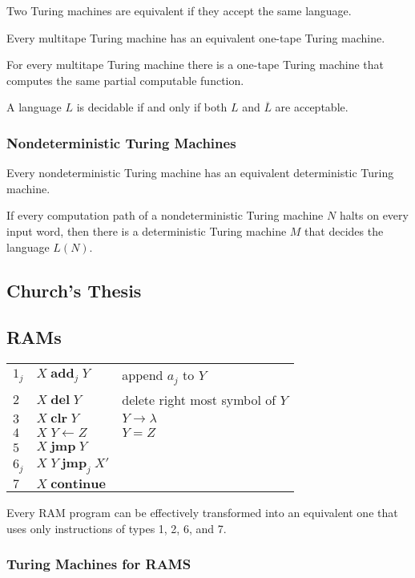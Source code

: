  Two Turing machines are equivalent if they accept the same
language.

 Every multitape Turing machine has an equivalent one-tape
Turing machine.

 For every multitape Turing machine there is a one-tape
Turing machine that computes the same partial computable function.

 A language $L$ is decidable if and only if both $L$ and
$\overline{L}$ are acceptable.

\subsubsection{Nondeterministic Turing Machines}

 Every nondeterministic Turing machine has an equivalent
deterministic Turing machine.

 If every computation path of a nondeterministic Turing
machine $N$ halts on every input word, then there is a deterministic Turing
machine $M$ that decides the language $L(N)$.

\subsection{Church's Thesis}

\subsection{RAMs}

\begin{table}[H]
  \begin{tabular}{lll}
    $1_j$ & $X\;\mathbf{add}_j\;Y$ & append $a_j$ to $Y$\\
    $2$ & $X\;\mathbf{del}\;Y$ & delete right most symbol of $Y$\\
    $3$ & $X\;\mathbf{clr}\;Y$ & $Y \rightarrow \lambda$\\
    $4$ & $X\;Y\leftarrow Z$ & $Y=Z$\\
    $5$ & $X\;\mathbf{jmp}\;Y$\\
    $6_j$ & $X\;Y\;\mathbf{jmp}_j\;X'$\\
    $7$ & $X\;\mathbf{continue}$
  \end{tabular}
\end{table}

 Every RAM program can be effectively transformed into an
equivalent one that uses only instructions of types 1, 2, 6, and 7.

\subsubsection{Turing Machines for RAMS}

